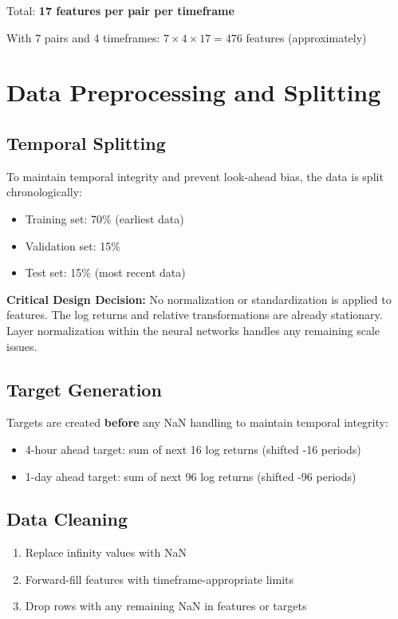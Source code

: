 \documentclass[12pt,a4paper]{article}
\begin{document}
Total: \textbf{17 features per pair per timeframe}

With 7 pairs and 4 timeframes: $7 \times 4 \times 17 = 476$ features (approximately)

\section{Data Preprocessing and Splitting}

\subsection{Temporal Splitting}
To maintain temporal integrity and prevent look-ahead bias, the data is split chronologically:
\begin{itemize}
    \item Training set: 70\% (earliest data)
    \item Validation set: 15\%
    \item Test set: 15\% (most recent data)
\end{itemize}

\textbf{Critical Design Decision:} No normalization or standardization is applied to features. The log returns and relative transformations are already stationary. Layer normalization within the neural networks handles any remaining scale issues.

\subsection{Target Generation}
Targets are created \textbf{before} any NaN handling to maintain temporal integrity:
\begin{itemize}
    \item 4-hour ahead target: sum of next 16 log returns (shifted -16 periods)
    \item 1-day ahead target: sum of next 96 log returns (shifted -96 periods)
\end{itemize}

\subsection{Data Cleaning}
\begin{enumerate}
    \item Replace infinity values with NaN
    \item Forward-fill features with timeframe-appropriate limits
    \item Drop rows with any remaining NaN in features or targets
\end{enumerate}
\end{document}
